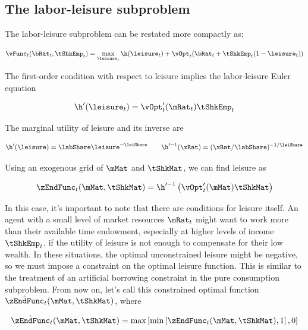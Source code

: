 \documentclass{article}
\begin{document}
\subsection{The labor-leisure subproblem}

The labor-leisure subproblem can be restated more compactly as:

\begin{equation}
\vFunc_{t}(\bRat_{t}, \tShkEmp_{t}) = \max_{ \leisure_{t}}
    \h(\leisure_{t}) + \vOpt_{t}(\bRat_{t} +
    \tShkEmp_{t}(1-\leisure_{t}))
\end{equation}

The first-order condition with respect to leisure implies the labor-leisure Euler equation

\begin{equation}
\h'(\leisure_{t}) = \vOpt_{t}'(\mRat_{t}) \tShkEmp_{t}
\end{equation}

The marginal utility of leisure and its inverse are

\begin{equation}
\h'(\leisure) = \labShare\leisure^{-\leiShare} \qquad
    \h'^{-1}(\xRat) = (\xRat/\labShare)^{-1/\leiShare}
\end{equation}

Using an exogenous grid of $\mMat$ and $\tShkMat$, we can find leisure as

\begin{equation}
\zEndFunc_{t}(\mMat, \tShkMat) = \h'^{-1}\left(
    \vOpt_{t}'(\mMat) \tShkMat \right)
\end{equation}

In this case, it's important to note that there are conditions for leisure itself. An agent with a small level of market resources $\mRat_{t}$ might want to work more than their available time endowment, especially at higher levels of income $\tShkEmp_{t}$, if the utility of leisure is not enough to compensate for their low wealth. In these situations, the optimal unconstrained leisure might be negative, so we must impose a constraint on the optimal leisure function. This is similar to the treatment of an artificial borrowing constraint in the pure consumption subproblem. From now on, let's call this constrained optimal function $\hat{\zEndFunc}_{t}(\mMat, \tShkMat)$, where

\begin{equation}
\hat{\zEndFunc}_{t}(\mMat, \tShkMat) = \max \left[ \min \left[ \zEndFunc_{t}(\mMat, \tShkMat), 1 \right], 0 \right]
\end{equation}
\end{document}
